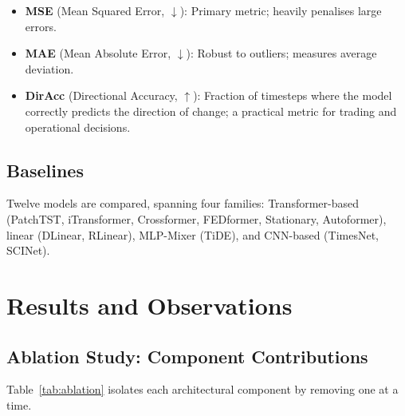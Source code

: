 \documentclass[11pt, letterpaper]{article}
\begin{document}
\begin{itemize}
  \item \textbf{MSE} (Mean Squared Error, $\downarrow$): Primary metric; heavily penalises large errors.
  \item \textbf{MAE} (Mean Absolute Error, $\downarrow$): Robust to outliers; measures average deviation.
  \item \textbf{DirAcc} (Directional Accuracy, $\uparrow$): Fraction of timesteps where the model correctly predicts the direction of change; a practical metric for trading and operational decisions.
\end{itemize}

\subsection{Baselines}

Twelve models are compared, spanning four families: Transformer-based (PatchTST, iTransformer, Crossformer, FEDformer, Stationary, Autoformer), linear (DLinear, RLinear), MLP-Mixer (TiDE), and CNN-based (TimesNet, SCINet).

\section{Results and Observations}
\label{sec:results}

\subsection{Ablation Study: Component Contributions}

Table~\ref{tab:ablation} isolates each architectural component by removing one at a time.
\end{document}
